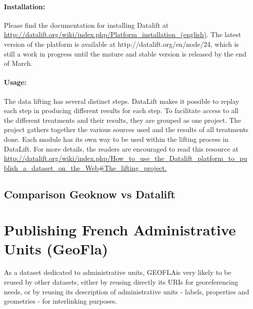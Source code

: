 \paragraph{Installation:}
Please find the documentation for installing Datalift at \url{http://datalift.org/wiki/index.php/Platform_installation_(english)}. The latest version of the platform is available at http://datalift.org/en/node/24, which is still a work in progress until the mature and stable version is released by the end of March. 

\paragraph{Usage:}
The data lifting has several distinct steps. DataLift makes it possible to replay each step in producing different results for each step. To facilitate access to all the different treatments and their results, they are grouped as one project. The project gathers together the various sources used and the results of all treatments done.
Each module has its own way to be used within the lifting process in DataLift. For more details, the readers are encouraged to read this resource at \url{http://datalift.org/wiki/index.php/How_to_use_the_Datalift_platform_to_publish_a_dataset_on_the_Web#The_lifting_project. 
}


\subsection{Comparison Geoknow vs Datalift}


\section{Publishing French Administrative Units (GeoFla)} \label{sec:geofla}
As a dataset dedicated to administrative units, GEOFLA\circledR is very likely to be reused by other datasets, either by reusing directly its URIs for georeferencing needs, or by reusing its description of administrative units - labels, properties and geometries - for interlinking purposes. 


